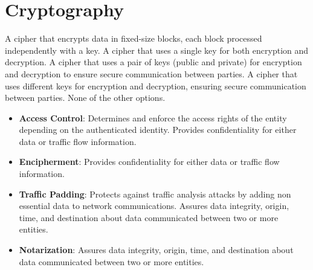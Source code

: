 \section{Cryptography}





\begin{checkboxes}
    \choice A cipher that encrypts data in fixed-size blocks, each block processed independently with a key.
    \choice A cipher that uses a single key for both encryption and decryption.
    \CorrectChoice A cipher that uses a pair of keys (public and private) for encryption and decryption to ensure secure communication between parties.
    \CorrectChoice A cipher that uses different keys for encryption and decryption, ensuring secure communication between parties.
    \choice None of the other options.
\end{checkboxes}


\begin{solution}
    \begin{itemize}
        \item \textbf{Access Control}: Determines and enforce the access rights of the entity depending on the authenticated identity. Provides confidentiality for either data or traffic flow information.
        \item \textbf{Encipherment}: Provides confidentiality for either data or traffic flow information.
        \item \textbf{Traffic Padding}: Protects against traffic analysis attacks by adding non essential data to network communications. Assures data integrity, origin, time, and destination about data communicated between two or more entities.
        \item \textbf{Notarization}: Assures data integrity, origin, time, and destination about data communicated between two or more entities.
    \end{itemize}
\end{solution}


